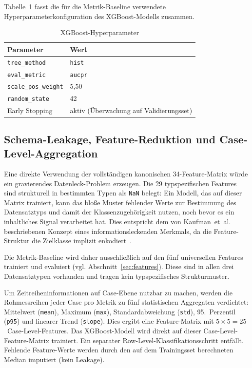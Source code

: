 Tabelle~\ref{tab:xgb_params} fasst die für die Metrik-Baseline verwendete Hyperparameterkonfiguration des XGBoost-Modells zusammen.

\begin{table}[htb]
  \centering
  \caption{XGBoost-Hyperparameter}
  \label{tab:xgb_params}
  \begin{tabular}{ll}
    \hline
    \textbf{Parameter} & \textbf{Wert} \\
    \hline
    \texttt{tree\_method}      & \texttt{hist} \\
    \texttt{eval\_metric}      & \texttt{aucpr} \\
    \texttt{scale\_pos\_weight} & 5{,}50 \\
    \texttt{random\_state}     & 42 \\
    Early Stopping             & aktiv (Überwachung auf Validierungsset) \\
    \hline
  \end{tabular}
\end{table}

\FloatBarrier
\subsection{Schema-Leakage, Feature-Reduktion und Case-Level-Aggregation}

Eine direkte Verwendung der vollständigen kanonischen 34-Feature-Matrix würde ein gravierendes Datenleck-Problem erzeugen. Die 29 typspezifischen Features sind strukturell in bestimmten Typen als \texttt{NaN} belegt: Ein Modell, das auf dieser Matrix trainiert, kann das bloße Muster fehlender Werte zur Bestimmung des Datensatztyps und damit der Klassenzugehörigkeit nutzen, noch bevor es ein inhaltliches Signal verarbeitet hat. Dies entspricht dem von Kaufman~et~al. beschriebenen Konzept eines informationsleckenden Merkmals, da die Feature-Struktur die Zielklasse implizit enkodiert~\cite{kaufman2012leakage}.

Die Metrik-Baseline wird daher ausschließlich auf den fünf universellen Features trainiert und evaluiert (vgl. Abschnitt~\ref{sec:features}). Diese sind in allen drei Datensatztypen vorhanden und tragen kein typspezifisches Strukturmuster.

Um Zeitreiheninformationen auf Case-Ebene nutzbar zu machen, werden die Rohmessreihen jeder Case pro Metrik zu fünf statistischen Aggregaten verdichtet: Mittelwert (\texttt{mean}), Maximum (\texttt{max}), Standardabweichung (\texttt{std}), 95.~Perzentil (\texttt{p95}) und linearer Trend (\texttt{slope}). Dies ergibt eine Feature-Matrix mit $5 \times 5 = 25$~Case-Level-Features. Das XGBoost-Modell wird direkt auf dieser Case-Level-Feature-Matrix trainiert. Ein separater Row-Level-Klassifikationsschritt entfällt. Fehlende Feature-Werte werden durch den auf dem Trainingsset berechneten Median imputiert (kein Leakage).

